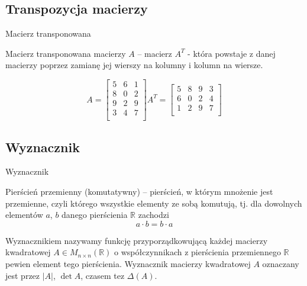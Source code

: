 \documentclass[polish,10pt]{beamer}
\begin{document}
\subsection{Transpozycja macierzy}
\begin{frame}{Macierz transponowana}
    \begin{definition}
        Macierz transponowana\cite{Macierz_transponowana} macierzy $A$ – macierz $A^T$ - która powstaje z danej macierzy poprzez zamianę jej wierszy na kolumny i kolumn na wiersze.
    \end{definition}
    
    \begin{example}
    \begin{equation*}
        A =
        \begin{bmatrix}
            5 & 6 & 1 \\
            8 & 0 & 2 \\
            9 & 2 & 9 \\
            3 & 4 & 7 \\
        \end{bmatrix}
        A^T = 
        \begin{bmatrix}
            5 & 8 & 9 & 3 \\
            6 & 0 & 2 & 4 \\
            1 & 2 & 9 & 7\\
        \end{bmatrix}
    \end{equation*}
    \end{example}
\end{frame}

\subsection{Wyznacznik}
\begin{frame}{Wyznacznik}
\begin{definition}
    Pierścień przemienny (komutatywny) – pierścień, w którym mnożenie jest przemienne, czyli którego wszystkie elementy ze sobą komutują, tj. dla dowolnych elementów $a$, $b$ danego pierścienia $\mathbb{R}$ zachodzi \begin{equation*}
        a \cdot b = b \cdot a
    \end{equation*}
\end{definition}
\begin{definition}
    Wyznacznikiem \cite{Wyznacznik} nazywamy funkcję przyporządkowującą każdej macierzy kwadratowej $A \in M_{n \times n}(\mathbb{R})$ o współczynnikach z pierścienia przemiennego $\mathbb{R}$ pewien element tego pierścienia.
    Wyznacznik macierzy kwadratowej $A$ oznaczany jest przez $|A|$, $\det A$, czasem tez $\Delta(A)$.
\end{definition}
\end{frame}
\end{document}
